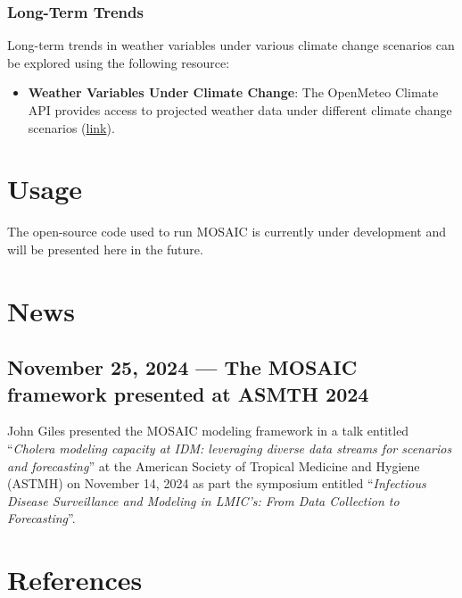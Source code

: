 \documentclass[
]{book}
\providecommand{\tightlist}{%
  \setlength{\itemsep}{0pt}\setlength{\parskip}{0pt}}
\begin{document}
\subsection{Long-Term Trends}\label{long-term-trends}

Long-term trends in weather variables under various climate change scenarios can be explored using the following resource:

\begin{itemize}
\tightlist
\item
  \textbf{Weather Variables Under Climate Change}: The OpenMeteo Climate API provides access to projected weather data under different climate change scenarios (\href{https://open-meteo.com/en/docs/climate-api}{link}).
\end{itemize}

\chapter{Usage}\label{usage}

The open-source code used to run MOSAIC is currently under development and will be presented here in the future.

\chapter{News}\label{news}

\section*{November 25, 2024 --- The MOSAIC framework presented at ASMTH 2024}\label{november-25-2024-the-mosaic-framework-presented-at-asmth-2024}

John Giles presented the MOSAIC modeling framework in a talk entitled ``\emph{Cholera modeling capacity at IDM:
leveraging diverse data streams for scenarios and forecasting}'' at the American Society of Tropical Medicine and Hygiene (ASTMH) on November 14, 2024 as part the symposium entitled ``\emph{Infectious Disease Surveillance and Modeling in LMIC's: From Data Collection to Forecasting}''.

\chapter{References}\label{references}

  
\end{document}
